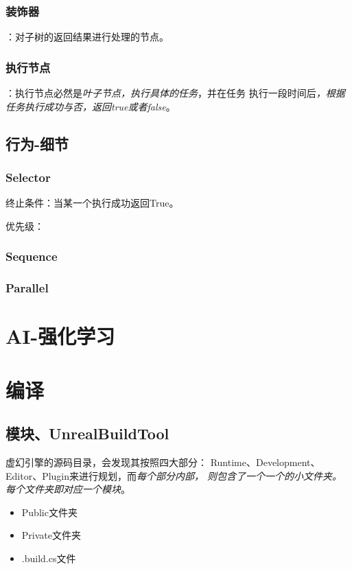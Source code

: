 \documentclass[UTF8,a4paper,12pt]{ctexbook}
\begin{document}
		\subsection{装饰器}：对子树的返回结果进行处理的节点。	
		
		\subsection{执行节点}：执行节点必然是\textit{叶子节点，执行具体的任务}，并在任务 执行一段时间后\textit{，根据任务执行成功与否，返回true或者false}。
	
	
	\section{行为-细节}
		\subsection{Selector}
			终止条件：当某一个执行成功返回True。
			
			优先级：
		
		\subsection{Sequence}
			
		
		\subsection{Parallel}
		
		

\chapter{AI-强化学习}	





\chapter{编译}
	\section{模块、UnrealBuildTool}
		虚幻引擎的源码目录，会发现其按照四大部分： Runtime、Development、Editor、Plugin来进行规划，而\textit{每个部分内部， 则包含了一个一个的小文件夹。每个文件夹即对应一个模块}。
		
		\begin{itemize}
			\item Public文件夹 
			\item Private文件夹 
			\item .build.cs文件
		\end{itemize}
	
\end{document}
